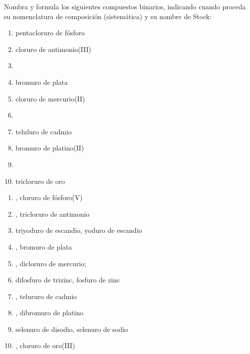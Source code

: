 \documentclass[10pt,a5paper,twoside]{article}
\begin{document}
\begin{exercise}[
    tags    = {inorgánica,compuestos binarios,sales binarias,sales},
    topics  = {química inorgánica,formulación,nomenclatura},
    source  = {SAN Formulación, p26, e29},
  ]
  Nombra y formula los siguientes compuestos binarios, indicando cuando proceda su nomenclatura de composición (sistemática) y su nombre de Stock:

  \begin{enumerate}
    \item pentacloruro de fósforo
    \item cloruro de antimonio(III)
    \item {}
    \item bromuro de plata
    \item cloruro de mercurio(II)
    \item {}
    \item teluluro de cadmio
    \item bromuro de platino(II)
    \item {}
    \item tricloruro de oro
  \end{enumerate}
\end{exercise}

\begin{solution}
  \begin{enumerate}
    \item {}, cloruro de fósforo(V)
    \item {}, tricloruro de antimonio
    \item triyoduro de escandio, yoduro de escandio
    \item {}, bromuro de plata
    \item {}, dicloruro de mercurio;
    \item difosfuro de trizinc, fosfuro de zinc
    \item {}, telururo de cadmio
    \item {}, dibromuro de platino
    \item selenuro de disodio, selenuro de sodio
    \item {}, cloruro de oro(III)
  \end{enumerate}
\end{solution}
\end{document}
